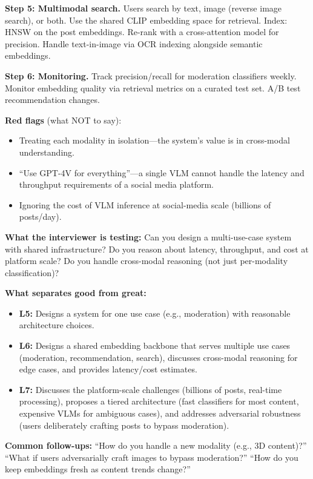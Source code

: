 \begin{interviewq}
\textbf{Step 5: Multimodal search.} Users search by text, image (reverse image search), or both. Use the shared CLIP embedding space for retrieval. Index: HNSW on the post embeddings. Re-rank with a cross-attention model for precision. Handle text-in-image via OCR indexing alongside semantic embeddings.

\textbf{Step 6: Monitoring.} Track precision/recall for moderation classifiers weekly. Monitor embedding quality via retrieval metrics on a curated test set. A/B test recommendation changes.

\textbf{Red flags} (what NOT to say):
\begin{itemize}
    \item Treating each modality in isolation---the system's value is in cross-modal understanding.
    \item ``Use GPT-4V for everything''---a single VLM cannot handle the latency and throughput requirements of a social media platform.
    \item Ignoring the cost of VLM inference at social-media scale (billions of posts/day).
\end{itemize}

\textbf{What the interviewer is testing:} Can you design a multi-use-case system with shared infrastructure? Do you reason about latency, throughput, and cost at platform scale? Do you handle cross-modal reasoning (not just per-modality classification)?

\textbf{What separates good from great:}
\begin{itemize}
    \item \textbf{L5:} Designs a system for one use case (e.g., moderation) with reasonable architecture choices.
    \item \textbf{L6:} Designs a shared embedding backbone that serves multiple use cases (moderation, recommendation, search), discusses cross-modal reasoning for edge cases, and provides latency/cost estimates.
    \item \textbf{L7:} Discusses the platform-scale challenges (billions of posts, real-time processing), proposes a tiered architecture (fast classifiers for most content, expensive VLMs for ambiguous cases), and addresses adversarial robustness (users deliberately crafting posts to bypass moderation).
\end{itemize}

\textbf{Common follow-ups:} ``How do you handle a new modality (e.g., 3D content)?'' ``What if users adversarially craft images to bypass moderation?'' ``How do you keep embeddings fresh as content trends change?''
\end{interviewq}

